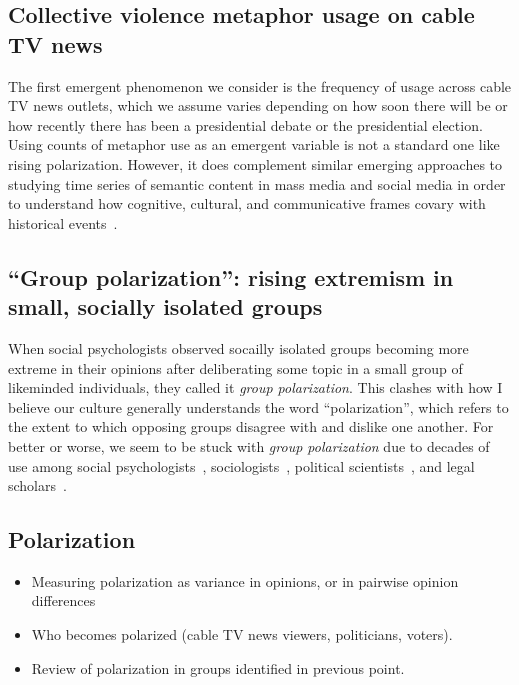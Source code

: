 \documentclass[12pt,letterpaper]{article}
\begin{document}
\subsection{Collective violence metaphor usage on cable TV news}

The first emergent phenomenon we consider is the frequency of usage across
cable TV news outlets, which we assume varies depending on how soon there will
be or how recently there has been a presidential debate or the presidential 
election. Using counts of metaphor use as an emergent variable 
is not a standard one like rising polarization. However, it does 
complement similar emerging approaches to studying time series of semantic content in
mass media and social media in order to understand how cognitive, cultural, and
communicative frames covary with historical 
events~\cite{Nunn2012,Klingenstein2014,Hamilton2016c,Caliskan2017,Barron2018,Garg2018}. 


\subsection{``Group polarization'': rising extremism in small, socially isolated groups}

When social psychologists observed socailly isolated groups becoming more extreme
in their opinions after deliberating some topic in a small group of likeminded
individuals, they called it \emph{group polarization}. 
This clashes with how I believe our culture generally understands the word
``polarization'', which refers to the extent to which opposing groups disagree with
and dislike one another. For better or worse, we seem to be stuck with 
\emph{group polarization} due to decades of 
use among social psychologists~\cite{Brown1986,Sieber2019},
sociologists~\cite{Friedkin1999a}, political scientists~\cite{Schkade2010}, and legal scholars~\cite{Sunstein2002}.

\subsection{Polarization}

\begin{itemize}
  \item
    Measuring polarization as variance in opinions, or in pairwise opinion differences
  \item 
    Who becomes polarized (cable TV news viewers, politicians, voters).
  \item
    Review of polarization in groups identified in previous point.
\end{itemize}
\end{document}
